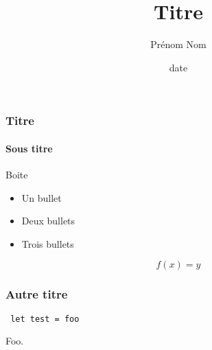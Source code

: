 \documentclass{beamer}
\title{Titre}
\author{Prénom Nom}
\institute[\textsc{Upmc}]{Université Pierre et Marie Curie}
\date{date}
\begin{document}
\begin{frame}

\titlepage

\end{frame}

\begin{frame}

\frametitle{Titre}
\framesubtitle{Sous titre}

\begin{block}{Boite}
  \begin{itemize}
  \item Un bullet
  \item Deux bullets
  \item Trois bullets
  \end{itemize}
\end{block}

\begin{block}{}
  $$f(x) = y$$
\end{block}

\end{frame}


\begin{frame}[fragile]

\frametitle{Autre titre}

\begin{lstlisting}
 let test = foo
\end{lstlisting}

\begin{block}{}
  Foo.
\end{block}

\end{frame}

\newcommand{\intg}{\ensuremath{\mathsf{int}}}
\newcommand{\bool}{\ensuremath{\mathsf{bool}}}
\newcommand{\Lam}[2]{\ensuremath{\lambda #1. #2}}
\newcommand{\App}[2]{\ensuremath{#1\:#2}}
\newcommand{\Var}[1]{\ensuremath{#1}}
\newcommand{\Fst}[1]{\ensuremath{#1.\pi_0}}
\newcommand{\Snd}[1]{\ensuremath{#1.\pi_1}}
\newcommand{\Pair}[2]{\ensuremath{(#1, #2)}}
\newcommand{\ifte}[4][]{\ensuremath{\mathsf{if}_{#1}\: #2\: \mathsf{then}\: #3\: \mathsf{else}\: #4}}
\newcommand{\true}{\ensuremath{\mathsf{true}}}
\newcommand{\false}{\ensuremath{\mathsf{false}}}
\newcommand{\zero}{\ensuremath{\mathsf{zero}}} 
\newcommand{\succs}{\ensuremath{\mathsf{succ}}}
\newcommand{\iter}{\ensuremath{\mathsf{iter}}}
\end{document}
